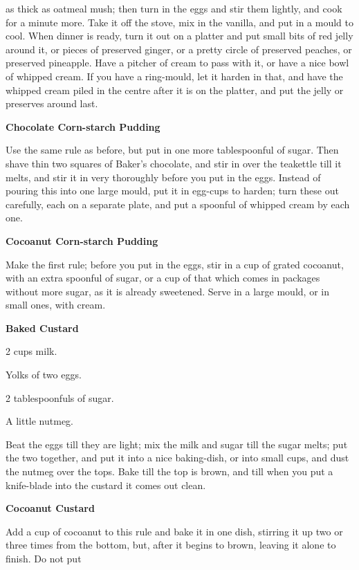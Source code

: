 \documentclass[11pt]{book}
\newcommand{\indpar}{\par\noindent\hspace*{\parindent}}
\newcommand{\ingredient}{\indpar}
\newcommand{\instruction}{\indpar}
\newenvironment{RecipeTitle}{\medskip\begin{center}\large\bf }{\end{center}\smallskip}
\begin{document}
as thick as oatmeal mush; then turn in the eggs and stir them
lightly, and cook for a minute more.  Take it off the stove,
mix in the vanilla, and put in a mould to cool.  When dinner
is ready, turn it out on a platter and put small bits of red
jelly around it, or pieces of preserved ginger, or a pretty
circle of preserved peaches, or preserved pineapple.  Have a
pitcher of cream to pass with it, or have a nice bowl of
whipped cream.  If you have a ring-mould, let it harden in
that, and have the whipped cream piled in the centre after it
is on the platter, and put the jelly or preserves around last.
\begin{RecipeTitle}
Chocolate Corn-starch Pudding\label{chocolate_cornstarch_pudding}
\end{RecipeTitle}
\instruction  Use the same rule as before, but put in one more
tablespoonful of sugar.  Then shave thin two squares of
Baker's chocolate, and stir in over the teakettle till it
melts, and stir it in very thoroughly before you put in the
eggs.  Instead of pouring this into one large mould, put it in
egg-cups to harden; turn these out carefully, each on a
separate plate, and put a spoonful of whipped cream by each one.
\begin{RecipeTitle}
Cocoanut Corn-starch Pudding\label{cocoanut_cornstarch_pudding}
\end{RecipeTitle}
\instruction  Make the first rule; before you put in the eggs, stir in a
cup of grated cocoanut, with an extra spoonful of sugar, or a
cup of that which comes in packages without more sugar, as it
is already sweetened.  Serve in a large mould, or in small
ones, with cream.\pagebreak[4]
\begin{RecipeTitle}
Baked Custard\label{baked_custard}
\end{RecipeTitle}
\ingredient  2 cups milk.
\ingredient  Yolks of two eggs.
\ingredient  2 tablespoonfuls of sugar.
\ingredient  A little nutmeg.
\instruction  Beat the eggs till they are light; mix the milk and sugar
till the sugar melts; put the two together, and put it into a
nice baking-dish, or into small cups, and dust the nutmeg over
the tops.  Bake till the top is brown, and till when you put a
knife-blade into the custard it comes out clean.
\begin{RecipeTitle}
Cocoanut Custard\label{cocoanut_custard}
\end{RecipeTitle}
\instruction  Add a cup of cocoanut to this rule and bake it in one dish,
stirring it up two or three times from the bottom, but, after
it begins to brown, leaving it alone to finish.  Do not put
\end{document}
